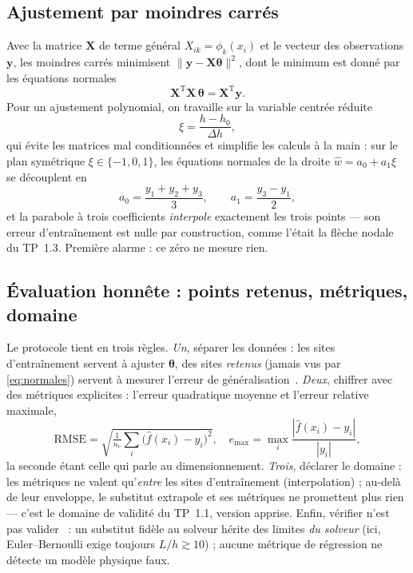 \documentclass[10pt,journal]{IEEEtran}
\begin{document}
\subsection{Ajustement par moindres carrés}
Avec la matrice $\mathbf{X}$ de terme général $X_{ik}=\phi_k(x_i)$ et le vecteur des observations $\mathbf{y}$, les moindres carrés minimisent $\lVert\mathbf{y}-\mathbf{X}\boldsymbol\theta\rVert^2$, dont le minimum est donné par les équations normales~\cite{hastie}
\begin{equation}
\mathbf{X}^{\mathrm T}\mathbf{X}\,\boldsymbol\theta = \mathbf{X}^{\mathrm T}\mathbf{y}.
\label{eq:normales}
\end{equation}
Pour un ajustement polynomial, on travaille sur la variable centrée réduite
\begin{equation}
\xi = \frac{h - h_0}{\Delta h},
\label{eq:xi}
\end{equation}
qui évite les matrices mal conditionnées et simplifie les calculs à la main : sur le plan symétrique $\xi\in\{-1,0,1\}$, les équations normales de la droite $\hat w = a_0 + a_1\xi$ se découplent en
\begin{equation}
a_0 = \frac{y_1+y_2+y_3}{3}, \qquad a_1 = \frac{y_3-y_1}{2},
\label{eq:droite}
\end{equation}
et la parabole à trois coefficients \emph{interpole} exactement les trois points --- son erreur d'entraînement est nulle par construction, comme l'était la flèche nodale du TP~1.3. Première alarme : ce zéro ne mesure rien.

\subsection{Évaluation honnête : points retenus, métriques, domaine}
\label{sec:honnete}
Le protocole tient en trois règles. \emph{Un}, séparer les données : les sites d'entraînement servent à ajuster $\boldsymbol\theta$, des sites \emph{retenus} (jamais vus par \eqref{eq:normales}) servent à mesurer l'erreur de généralisation~\cite{hastie}. \emph{Deux}, chiffrer avec des métriques explicites : l'erreur quadratique moyenne et l'erreur relative maximale,
\begin{equation}
\mathrm{RMSE} = \sqrt{\tfrac{1}{n_v}\textstyle\sum_i\big(\hat f(x_i)-y_i\big)^2},
\quad
e_{\max} = \max_i \frac{|\hat f(x_i)-y_i|}{|y_i|},
\label{eq:metriques}
\end{equation}
la seconde étant celle qui parle au dimensionnement. \emph{Trois}, déclarer le domaine : les métriques ne valent qu'\emph{entre} les sites d'entraînement (interpolation) ; au-delà de leur enveloppe, le substitut extrapole et ses métriques ne promettent plus rien --- c'est le domaine de validité du TP~1.1, version apprise. Enfin, vérifier n'est pas valider~\cite{oberkampf} : un substitut fidèle au solveur hérite des limites \emph{du solveur} (ici, Euler--Bernoulli exige toujours $L/h\gtrsim 10$) ; aucune métrique de régression ne détecte un modèle physique faux.
\end{document}
